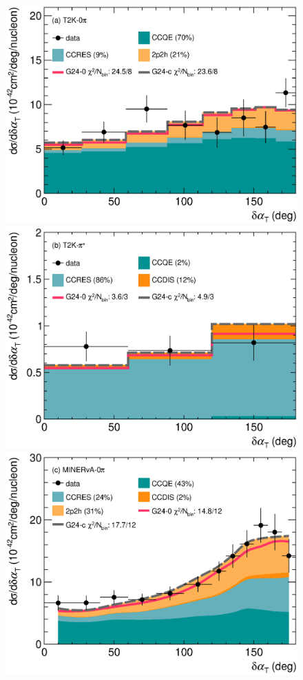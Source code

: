 \begin{figure} 
    \centering 		
    \includegraphics[width=\dbfigwid\textwidth]{figures/tuning/0026-t2k_0pi_dalphat_reac_decomp_covfix.eps}
    \includegraphics[width=\dbfigwid\textwidth]{figures/tuning/0026-t2k_pip_dalphat_reac_decomp_covfix.eps}
    \includegraphics[width=\dbfigwid\textwidth]{figures/tuning/0026-min_0pi_dalphat_reac_decomp_covfix.eps}

\end{figure}
